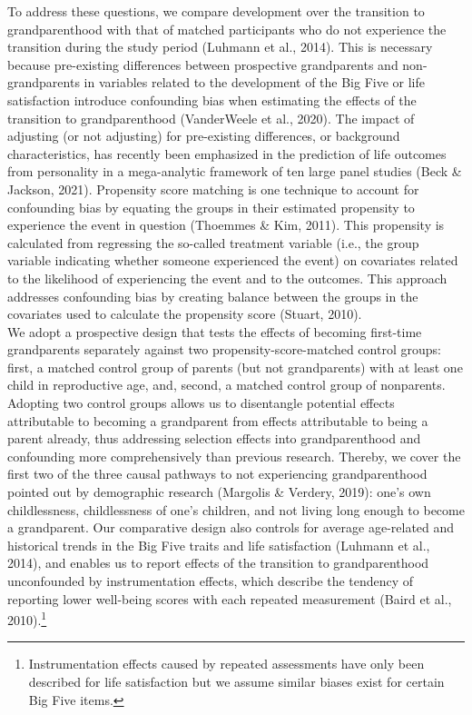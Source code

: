 \documentclass[
  english,
  man, noextraspace]{apa7}
\begin{document}
To address these questions, we compare development over the transition to grandparenthood with that of matched participants who do not experience the transition during the study period (Luhmann et al., 2014). This is necessary because pre-existing differences between prospective grandparents and non-grandparents in variables related to the development of the Big Five or life satisfaction introduce confounding bias when estimating the effects of the transition to grandparenthood (VanderWeele et al., 2020). The impact of adjusting (or not adjusting) for pre-existing differences, or background characteristics, has recently been emphasized in the prediction of life outcomes from personality in a mega-analytic framework of ten large panel studies (Beck \& Jackson, 2021). Propensity score matching is one technique to account for confounding bias by equating the groups in their estimated propensity to experience the event in question (Thoemmes \& Kim, 2011). This propensity is calculated from regressing the so-called treatment variable (i.e., the group variable indicating whether someone experienced the event) on covariates related to the likelihood of experiencing the event and to the outcomes. This approach addresses confounding bias by creating balance between the groups in the covariates used to calculate the propensity score (Stuart, 2010).\\
We adopt a prospective design that tests the effects of becoming first-time grandparents separately against two propensity-score-matched control groups: first, a matched control group of parents (but not grandparents) with at least one child in reproductive age, and, second, a matched control group of nonparents. Adopting two control groups allows us to disentangle potential effects attributable to becoming a grandparent from effects attributable to being a parent already, thus addressing selection effects into grandparenthood and confounding more comprehensively than previous research. Thereby, we cover the first two of the three causal pathways to not experiencing grandparenthood pointed out by demographic research (Margolis \& Verdery, 2019): one's own childlessness, childlessness of one's children, and not living long enough to become a grandparent. Our comparative design also controls for average age-related and historical trends in the Big Five traits and life satisfaction (Luhmann et al., 2014), and enables us to report effects of the transition to grandparenthood unconfounded by instrumentation effects, which describe the tendency of reporting lower well-being scores with each repeated measurement (Baird et al., 2010).\footnote{Instrumentation effects caused by repeated assessments have only been described for life satisfaction but we assume similar biases exist for certain Big Five items.}\\
\end{document}
